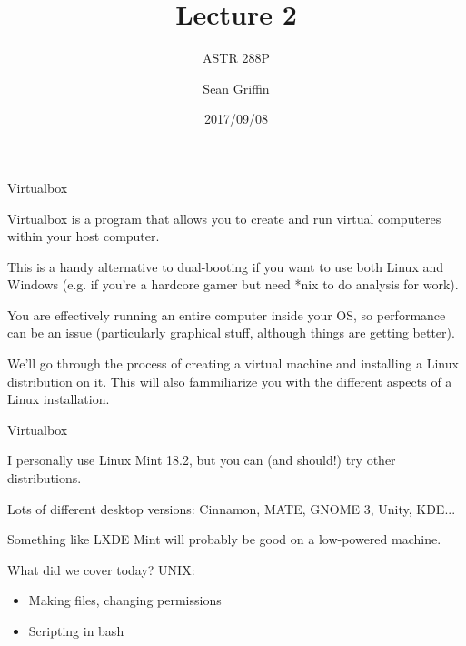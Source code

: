 \documentclass[10pt]{beamer}
\title{Lecture 2}
\subtitle{ASTR 288P}
\date{2017/09/08}
\author{Sean Griffin}
\institute{UMCP / NASA GSFC}
\begin{document}
\maketitle

\begin{frame}[fragile]{Virtualbox}

  Virtualbox is a program that allows you to create and run virtual computeres within your host computer.

  This is a handy alternative to dual-booting if you want to use both Linux and Windows (e.g. if you're a hardcore gamer but need *nix to do analysis for work).

  You are effectively running an entire computer inside your OS, so performance can be an issue (particularly graphical stuff, although things are getting better).

  We'll go through the process of creating a virtual machine and installing a Linux distribution on it. This will also fammiliarize you with the different aspects of a Linux installation.
\end{frame}

\begin{frame}[fragile]{Virtualbox}

  I personally use Linux Mint 18.2, but you can (and should!) try other distributions.

  Lots of different desktop versions: Cinnamon, MATE, GNOME 3, Unity, KDE...  
  
  Something like LXDE Mint will probably be good on a low-powered machine.
  
\end{frame}


\begin{frame}[fragile]{What did we cover today?}
UNIX:
	\begin{itemize}
        \item Making files, changing permissions 
        \item Scripting in bash
	\end{itemize}
\end{frame}
\end{document}
